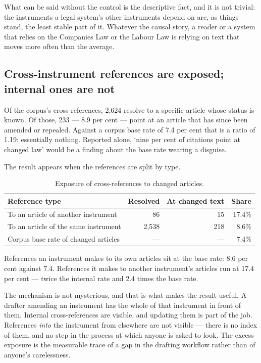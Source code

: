 \documentclass[11pt]{article}
\begin{document}
What can be said without the control is the descriptive fact, and it is not
trivial: the instruments a legal system's other instruments depend on are, as
things stand, the least stable part of it. Whatever the causal story, a reader
or a system that relies on the Companies Law or the Labour Law is relying on
text that moves more often than the average.

\subsection{Cross-instrument references are exposed; internal ones are not}

Of the corpus's cross-references, 2,624 resolve to a specific article whose
status is known. Of those, 233 --- 8.9 per cent --- point at an article that
has since been amended or repealed. Against a corpus base rate of 7.4 per cent
that is a ratio of 1.19: essentially nothing. Reported alone, `nine per cent
of citations point at changed law' would be a finding about the base rate
wearing a disguise.

The result appears when the references are split by type.

\begin{table}[t]
\centering
\small
\begin{tabular}{lrrr}
\toprule
\textbf{Reference type} & \textbf{Resolved} & \textbf{At changed text} &
\textbf{Share} \\
\midrule
To an article of another instrument & 86 & 15 & 17.4\% \\
To an article of the same instrument & 2,538 & 218 & 8.6\% \\
\midrule
Corpus base rate of changed articles & --- & --- & 7.4\% \\
\bottomrule
\end{tabular}
\caption{Exposure of cross-references to changed articles.}
\label{tab:exposure}
\end{table}

References an instrument makes to its own articles sit at the base rate: 8.6
per cent against 7.4. References it makes to another instrument's articles run
at 17.4 per cent --- twice the internal rate and 2.4 times the base rate.

The mechanism is not mysterious, and that is what makes the result useful. A
drafter amending an instrument has the whole of that instrument in front of
them. Internal cross-references are visible, and updating them is part of the
job. References \emph{into} the instrument from elsewhere are not visible ---
there is no index of them, and no step in the process at which anyone is asked
to look. The excess exposure is the measurable trace of a gap in the drafting
workflow rather than of anyone's carelessness.
\end{document}
